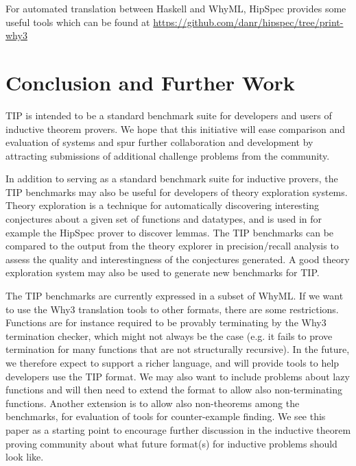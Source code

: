 \documentclass{llncs}
\begin{document}
For automated translation between Haskell and WhyML, HipSpec provides some useful tools which can be found at \url{https://github.com/danr/hipspec/tree/print-why3}

\section{Conclusion and Further Work}
TIP is intended to be a standard benchmark suite for developers and users of inductive theorem provers. We hope that this initiative will ease comparison and evaluation of systems and spur further collaboration and development by attracting submissions of additional challenge problems from the community. 

In addition to serving as a standard benchmark suite for inductive provers, the TIP benchmarks may also be useful for developers of theory exploration systems. Theory exploration is a technique for automatically discovering interesting conjectures about a given set of functions and datatypes, and is used in for example the HipSpec prover to discover lemmas. The TIP benchmarks can be compared to the output from the theory explorer in precision/recall analysis to assess the quality and interestingness of the conjectures generated. A good theory exploration system may also be used to generate new benchmarks for TIP.

The TIP benchmarks are currently expressed in a subset of WhyML. If we want to use the Why3 translation tools to other formats, there are some restrictions. Functions are for instance required to be provably terminating by the Why3 termination checker, which might not always be the case (e.g. it fails to prove termination for many functions that are not structurally recursive).  
In the future, we therefore expect to support a richer language, and will provide tools to help developers use the TIP format.
We may also want to include problems about lazy functions and will then need to extend the format to allow also non-terminating functions.  
Another extension is to allow also non-theorems among the benchmarks, for evaluation of tools for counter-example finding.  We see this paper as a starting point to encourage further discussion in the inductive theorem proving community about what future format(s) for inductive problems should look like.





\end{document}
